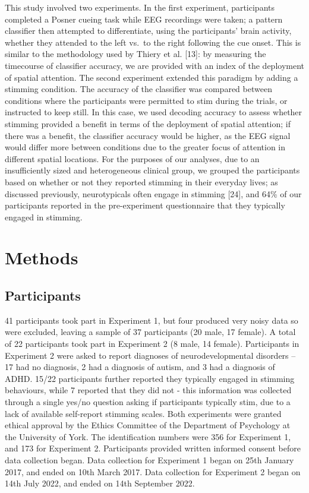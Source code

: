 \documentclass[
  letterpaper,
  DIV=11,
  numbers=noendperiod]{scrartcl}
\begin{document}
This study involved two experiments. In the first experiment,
participants completed a Posner cueing task while EEG recordings were
taken; a pattern classifier then attempted to differentiate, using the
participants' brain activity, whether they attended to the left vs.~to
the right following the cue onset. This is similar to the methodology
used by Thiery et al. {[}13{]}: by measuring the timecourse of
classifier accuracy, we are provided with an index of the deployment of
spatial attention. The second experiment extended this paradigm by
adding a stimming condition. The accuracy of the classifier was compared
between conditions where the participants were permitted to stim during
the trials, or instructed to keep still. In this case, we used decoding
accuracy to assess whether stimming provided a benefit in terms of the
deployment of spatial attention; if there was a benefit, the classifier
accuracy would be higher, as the EEG signal would differ more between
conditions due to the greater focus of attention in different spatial
locations. For the purposes of our analyses, due to an insufficiently
sized and heterogeneous clinical group, we grouped the participants
based on whether or not they reported stimming in their everyday lives;
as discussed previously, neurotypicals often engage in stimming
{[}24{]}, and 64\% of our participants reported in the pre-experiment
questionnaire that they typically engaged in stimming.

\section{Methods}\label{methods}

\subsection{Participants}\label{participants}

41 participants took part in Experiment 1, but four produced very noisy
data so were excluded, leaving a sample of 37 participants (20 male, 17
female). A total of 22 participants took part in Experiment 2 (8 male,
14 female). Participants in Experiment 2 were asked to report diagnoses
of neurodevelopmental disorders -- 17 had no diagnosis, 2 had a
diagnosis of autism, and 3 had a diagnosis of ADHD. 15/22 participants
further reported they typically engaged in stimming behaviours, while 7
reported that they did not - this information was collected through a
single yes/no question asking if participants typically stim, due to a
lack of available self-report stimming scales. Both experiments were
granted ethical approval by the Ethics Committee of the Department of
Psychology at the University of York. The identification numbers were
356 for Experiment 1, and 173 for Experiment 2. Participants provided
written informed consent before data collection began. Data collection
for Experiment 1 began on 25th January 2017, and ended on 10th March
2017. Data collection for Experiment 2 began on 14th July 2022, and
ended on 14th September 2022.
\end{document}
